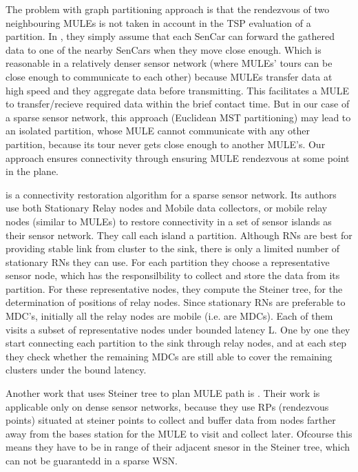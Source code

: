 The problem with graph partitioning approach is that the rendezvous of two neighbouring MULEs is not taken in account in the TSP evaluation of a partition. In \cite{sim4}, they simply assume that each SenCar can forward the gathered data to one of the nearby SenCars when they move close enough. Which is reasonable in a relatively denser sensor network (where MULEs' tours can be close enough to communicate to each other) because MULEs transfer data at high speed and they aggregate data before transmitting. This facilitates a MULE to transfer/recieve required data within the brief contact time. But in our case of a sparse sensor network, this approach  (Euclidean MST partitioning) may lead to an isolated partition, whose MULE cannot communicate with any other partition, because its tour never gets close enough to another MULE's. Our approach ensures connectivity through ensuring MULE rendezvous at some point in the plane.

\cite{sim3} is a connectivity restoration algorithm for a sparse sensor network. Its authors use both Stationary Relay nodes and Mobile data collectors, or mobile relay nodes (similar to MULEs) to restore connectivity in a set of sensor islands as their sensor network. They call each island a partition. Although RNs are best for providing stable link from cluster to the sink, there is only a limited number of stationary RNs they can use. For each partition they choose a representative sensor node, which has the responsilbility to collect and store the data from its partition. For these representative nodes, they compute the Steiner tree, for the determination of positions of relay nodes. Since stationary RNs are preferable to MDC's, initially all the relay nodes are mobile (i.e. are MDCs). Each of them visits a subset of representative nodes under bounded latency L. One by one they start connecting each partition to the sink through relay nodes, and at each step they check whether the remaining MDCs are still able to cover the remaining clusters under the bound latency.

Another work that uses Steiner tree to plan MULE path is \cite{rendezvous}. Their work is applicable only on dense sensor networks, because they use RPs (rendezvous points) situated at steiner points to collect and buffer data from nodes farther away from the bases station for the MULE to visit and collect later. Ofcourse this means they have to be in range of their adjacent snesor in the Steiner tree, which can not be guarantedd in a sparse WSN.